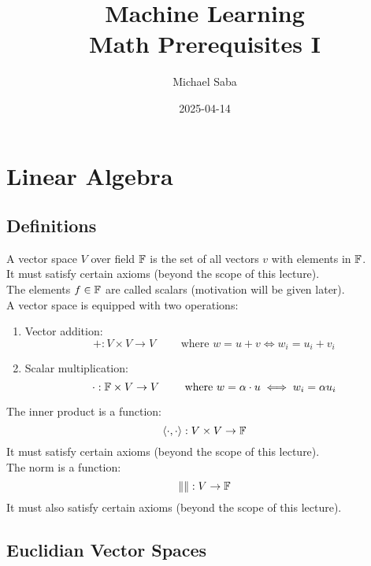 \documentclass[12pt]{article}
\title{%
    \Huge Machine Learning \\
    \Large Math Prerequisites I
}
\date{2025-04-14}
\author{Michael Saba}
\begin{document}
\maketitle
\newpage
\setlength{\parindent}{0pt}

    \section*{Linear Algebra}

    \subsection*{Definitions}

    A vector space $V$
    over field $\mathbb{F}$ is the set of all vectors
    $v$ with elements in $\mathbb{F}$. \\
    It must satisfy certain axioms
    (beyond the scope of this  lecture). \\
    
    The elements $f \in \mathbb{F}$ are called scalars
    (motivation will be given later). \\
    
    A vector space is equipped with two operations:
    \begin{enumerate}
        \item 
        Vector addition:
        \[ +: V \times V \to V \qquad \text{ where }
        w = u + v \iff
        w_i = u_i + v_i \]
    \item 
        Scalar multiplication:
        \[ \cdot: \mathbb{F} \times V \to V \qquad \text{ where }
        w = \alpha \cdot u \iff
        w_i = \alpha u_i\]
    \end{enumerate}

    The inner product is a function:
    \[ \langle \cdot , \cdot \rangle : V \times V \to \mathbb{F} \]
    It must satisfy certain axioms
    (beyond the scope of this  lecture). \\

    The norm is a function:
    \[ \|\|  : V \to \mathbb{F} \]
    It must also satisfy certain axioms
    (beyond the scope of this  lecture). \\

    \newpage

    \subsection*{Euclidian Vector Spaces}
\end{document}

